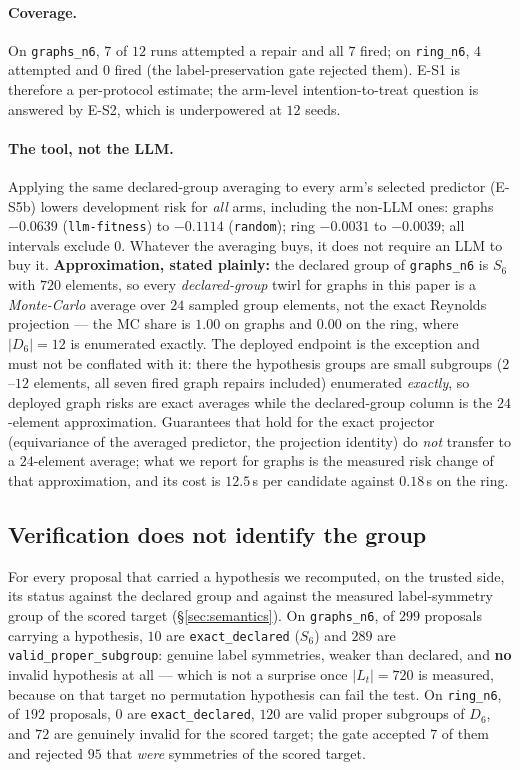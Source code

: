 \documentclass[11pt]{article}
\begin{document}
\paragraph{Coverage.} On \texttt{graphs\_n6}, $7$ of $12$ runs attempted a repair and all
$7$ fired; on \texttt{ring\_n6}, $4$ attempted and $0$ fired (the label-preservation gate
rejected them). E-S1 is therefore a per-protocol estimate; the arm-level intention-to-treat
question is answered by E-S2, which is underpowered at $12$ seeds.

\paragraph{The tool, not the LLM.} Applying the same declared-group averaging to every
arm's selected predictor (E-S5b) lowers development risk for \emph{all} arms, including
the non-LLM ones: graphs $-0.0639$ (\texttt{llm-fitness}) to $-0.1114$ (\texttt{random});
ring $-0.0031$ to $-0.0039$; all intervals exclude $0$. Whatever the averaging buys, it
does not require an LLM to buy it. \textbf{Approximation, stated plainly:} the declared
group of \texttt{graphs\_n6} is $S_6$ with $720$ elements, so every \emph{declared-group}
twirl for graphs in this paper is a \emph{Monte-Carlo} average over $24$ sampled group
elements, not the exact Reynolds projection --- the MC share is $1.00$ on graphs and $0.00$
on the ring, where $|D_6| = 12$ is enumerated exactly. The deployed endpoint is the
exception and must not be conflated with it: there the hypothesis groups are small subgroups
($2$--$12$ elements, all seven fired graph repairs included) enumerated \emph{exactly}, so
deployed graph risks are exact averages while the declared-group column is the
$24$-element approximation. Guarantees that hold for the exact projector
(equivariance of the averaged predictor, the projection identity) do \emph{not} transfer to
a $24$-element average; what we report for graphs is the measured risk change of that
approximation, and its cost is $12.5$\,s per candidate against $0.18$\,s on the ring.

\subsection{Verification does not identify the group}
\label{sec:selectivity}

For every proposal that carried a hypothesis we recomputed, on the trusted side, its status
against the declared group and against the measured label-symmetry group of the scored
target (\S\ref{sec:semantics}). On \texttt{graphs\_n6}, of $299$ proposals carrying a
hypothesis, $10$ are \texttt{exact\_declared} ($S_6$) and $289$ are
\texttt{valid\_proper\_subgroup}: genuine label symmetries, weaker than declared, and
\textbf{no} invalid hypothesis at all --- which is not a surprise once $|L_t| = 720$ is
measured, because on that target no permutation hypothesis can fail the test. On
\texttt{ring\_n6}, of $192$ proposals, $0$ are \texttt{exact\_declared}, $120$ are valid
proper subgroups of $D_6$, and $72$ are genuinely invalid for the scored target; the gate
accepted $7$ of them and rejected $95$ that \emph{were} symmetries of the scored target.
\end{document}
